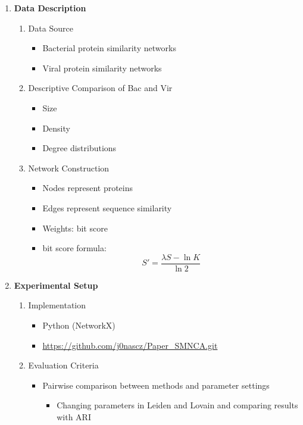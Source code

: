 \documentclass[12pt,a4paper]{article}
\begin{document}
\begin{enumerate}
\begin{enumerate}
  \item Louvain Method

  \item Leiden Method
  \begin{itemize}
    \item Theoretical Guarantees of the Leiden Algorithm

  \end{itemize}
\end{enumerate}

\item \textbf{Data Description}
\begin{enumerate}
  \item Data Source
  \begin{itemize}
    \item Bacterial protein similarity networks
    \item Viral protein similarity networks
  \end{itemize}

  \item Descriptive Comparison of Bac and Vir
  \begin{itemize}
    \item Size
    \item Density
    \item Degree distributions
  \end{itemize}

  \item Network Construction
  \begin{itemize}
    \item Nodes represent proteins
    \item Edges represent sequence similarity
    \item Weights: bit score
    \item bit score formula:
\[S' = \frac{\lambda S - \ln K}{\ln 2}\]
  \end{itemize}
\end{enumerate}

\item \textbf{Experimental Setup}
\begin{enumerate}
  \item Implementation
  \begin{itemize}
    \item Python (NetworkX)
    \item \url{https://github.com/j0nascz/Paper_SMNCA.git}
  \end{itemize}

\item Evaluation Criteria
\begin{itemize}
    \item Pairwise comparison between methods and parameter settings
    \begin{itemize}
      \item Changing parameters in Leiden and Lovain and comparing results with ARI
    \end{itemize}


\end{itemize}
\end{enumerate}
\end{enumerate}
\end{document}
